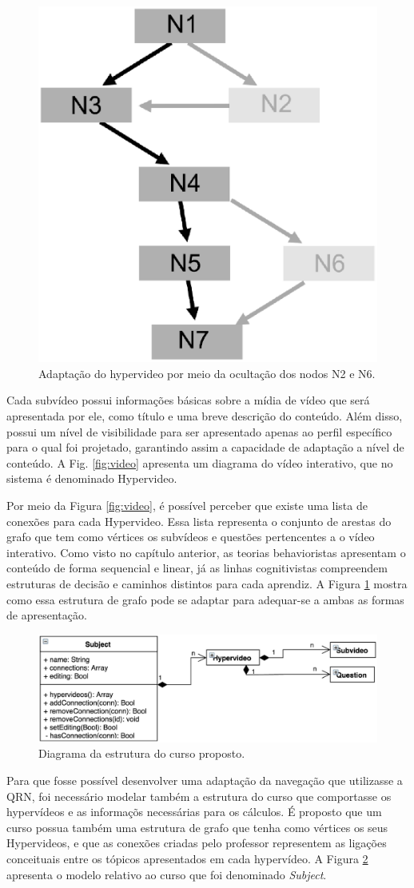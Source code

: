\begin{figure}[h!]
	\centering
  	\includegraphics[width=.3\linewidth]{figuras/estrutura.eps}
  	\caption{Adaptação do hypervideo por meio da ocultação dos nodos N2 e N6.}
  	\label{fig:estrutura}
\end{figure}

Cada subvídeo possui informações básicas sobre a mídia de vídeo que será apresentada por ele, como título e uma breve descrição do conteúdo. Além disso, possui um nível de visibilidade para ser apresentado apenas ao perfil específico para o qual foi projetado, garantindo assim a capacidade de adaptação a nível de conteúdo. A Fig. \ref{fig:video} apresenta um diagrama do vídeo interativo, que no sistema é denominado Hypervideo.

Por meio da Figura \ref{fig:video}, é possível perceber que existe uma lista de conexões para cada Hypervideo. Essa lista representa o conjunto de arestas do grafo que tem como vértices os subvídeos e questões pertencentes a o vídeo interativo. Como visto no capítulo anterior, as teorias behavioristas apresentam o conteúdo de forma sequencial e linear, já as linhas cognitivistas compreendem estruturas de decisão e caminhos distintos para cada aprendiz. A Figura \ref{fig:estrutura} mostra como essa estrutura de grafo pode se adaptar para adequar-se a ambas as formas de apresentação.

\begin{figure}[h!]
	\centering
  	\includegraphics[width=.7\linewidth]{figuras/curso.eps}
  	\caption{Diagrama da estrutura do curso proposto.}
  	\label{fig:curso}
\end{figure}

Para que fosse possível desenvolver uma adaptação da navegação que utilizasse a QRN, foi necessário modelar também a estrutura do curso que comportasse os hypervídeos e as informaçõs necessárias para os cálculos. É proposto que um curso possua também uma estrutura de grafo que tenha como vértices os seus Hypervideos, e que as conexões criadas pelo professor representem as ligações conceituais entre os tópicos apresentados em cada hypervídeo. A Figura \ref{fig:curso} apresenta o modelo relativo ao curso que foi denominado \textit{Subject}.

